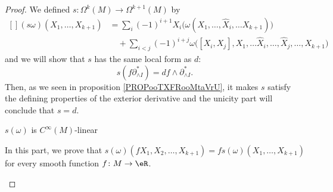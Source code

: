 \begin{proof}
	We defined \(s \colon \Omega^k(M)\to \Omega^{k+1}(M)  \) by
	\begin{equation}		\label{EQooZPNOooAXitUC}
		\begin{aligned}[]
			(s\omega)(X_1,\ldots,X_{k+1}) & =\sum_i(-1)^{i+1}X_i\big( \omega(X_1,\ldots,\hat X_i,\ldots X_{k+1}) \big)                              \\
			                              & \quad+\sum_{i<j}(-1)^{i+j}\omega\big( [X_i,X_j],X_1,\ldots\hat X_i,\ldots,\hat X_j,\ldots,X_{k+1} \big)
		\end{aligned}
	\end{equation}
	and we will show that \( s\) has the same local form as \( d\):
	\begin{equation}
		s(f\partial^*_{\wedge I})=df\wedge\partial^*_{\wedge I}.
	\end{equation}
	Then, as we seen in proposition \ref{PROPooTXFRooMtaVrU}, it makes \( s\) satisfy the defining properties of the exterior derivative and the unicity part will conclude that \( s=d\).


	\begin{proofpart}
		\( s(\omega)\) is \( C^{\infty}(M)\)-linear
	\end{proofpart}
	In this part, we prove that \( s(\omega)(fX_1,X_2,\ldots,X_{k+1})=fs(\omega)(X_1,\ldots,X_{k+1})\) for every smooth function \(f \colon M\to \eR  \).

	\begin{subproof}


\end{subproof}
\end{proof}
